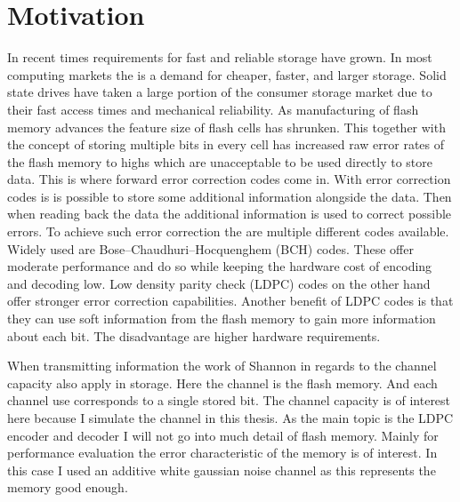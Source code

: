 
\chapter{Motivation}
In recent times requirements for fast and reliable storage have grown. In most computing markets the is a demand for cheaper, faster, and larger storage. Solid state drives have taken a large portion of the consumer storage market due to their fast access times and mechanical reliability. As manufacturing of flash memory advances the feature size of flash cells has shrunken. This together with the concept of storing multiple bits in every cell has increased raw error rates of the flash memory to highs which are unacceptable to be used directly to store data. This is where forward error correction codes come in. With error correction codes is is possible to store some additional information alongside the data. Then when reading back the data the additional information is used to correct possible errors. To achieve such error correction the are multiple different codes available. Widely used are Bose–Chaudhuri–Hocquenghem (BCH) codes. These offer moderate performance and do so while keeping the hardware cost of encoding and decoding low\cite{CaGh17}. Low density parity check (LDPC) codes on the other hand offer stronger error correction capabilities. Another benefit of LDPC codes is that they can use soft information from the flash memory to gain more information about each bit. The disadvantage are higher hardware requirements. 

When transmitting information the work of Shannon in regards to the channel capacity\cite{Sh48} also apply in storage. Here the channel is the flash memory. And each channel use corresponds to a single stored bit. The channel capacity is of interest here because I simulate the channel in this thesis. As the main topic is the LDPC encoder and decoder I will not go into much detail of flash memory. Mainly for performance evaluation the error characteristic of the memory is of interest. In this case I used an additive white gaussian noise channel as this represents the memory good enough.

